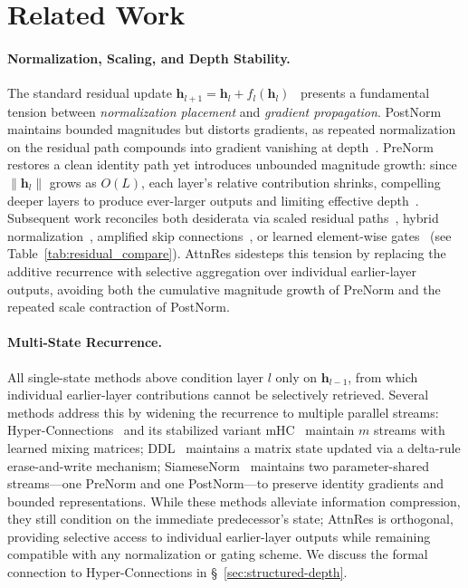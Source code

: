 \section{Related Work}

\paragraph{Normalization, Scaling, and Depth Stability.}
The standard residual update $\bm{h}_{l+1} = \bm{h}_l + f_l(\bm{h}_l)$~\citep{he2015resnet} presents a fundamental tension between \emph{normalization placement} and \emph{gradient propagation}.
PostNorm~\citep{vaswani-2017-attention} maintains bounded magnitudes but distorts gradients, as repeated normalization on the residual path compounds into gradient vanishing at depth~\citep{xiong2020layer}.
PreNorm~\citep{nguyen-salazar-2019-transformers,xiong2020layer} restores a clean identity path yet introduces unbounded magnitude growth: since $\|\bm{h}_l\|$ grows as $O(L)$, each layer's relative contribution shrinks, compelling deeper layers to produce ever-larger outputs and limiting effective depth~\citep{li2026siamesenorm}.
Subsequent work reconciles both desiderata via scaled residual paths~\citep{wang2022deepnorm}, hybrid normalization~\citep{zhuo2025hybridnorm}, amplified skip connections~\citep{chen2026postlayernorm}, or learned element-wise gates~\citep{srivastava2015highway} (see Table~\ref{tab:residual_compare}).
AttnRes sidesteps this tension by replacing the additive recurrence with selective aggregation over individual earlier-layer outputs, avoiding both the cumulative magnitude growth of PreNorm and the repeated scale contraction of PostNorm.

\paragraph{Multi-State Recurrence.}
All single-state methods above condition layer $l$ only on $\bm{h}_{l-1}$, from which individual earlier-layer contributions cannot be selectively retrieved.
Several methods address this by widening the recurrence to multiple parallel streams:
Hyper-Connections~\citep{zhu2025hyperconnections} and its stabilized variant mHC~\citep{xie2026mhc} maintain $m$ streams with learned mixing matrices;
DDL~\citep{zhang2026ddl} maintains a matrix state updated via a delta-rule erase-and-write mechanism;
SiameseNorm~\citep{li2026siamesenorm} maintains two parameter-shared streams---one PreNorm and one PostNorm---to preserve identity gradients and bounded representations.
While these methods alleviate information compression, they still condition on the immediate predecessor's state; AttnRes is orthogonal, providing selective access to individual earlier-layer outputs while remaining compatible with any normalization or gating scheme.
We discuss the formal connection to Hyper-Connections in \S~\ref{sec:structured-depth}.

